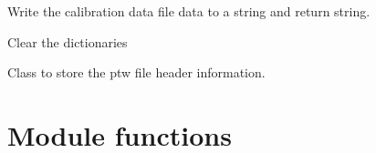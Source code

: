 \documentclass[a4paper,10pt,english]{sphinxmanual}
\begin{document}
\begin{fulllineitems}
\begin{fulllineitems}
\begin{description}
\end{description}

\end{fulllineitems}


\begin{fulllineitems}
\label{ryptw:pyradi.ryptw.JadeCalibrationData.info}
Write the calibration data file data to a string and return string.

\end{fulllineitems}


\begin{fulllineitems}
\label{ryptw:pyradi.ryptw.JadeCalibrationData.resetDict}
Clear the dictionaries

\end{fulllineitems}


\end{fulllineitems}


\begin{fulllineitems}
\label{ryptw:pyradi.ryptw.PTWFrameInfo}
Class to store the ptw file header information.

\end{fulllineitems}



\section{Module functions}
\label{ryptw:module-functions}
\end{document}
